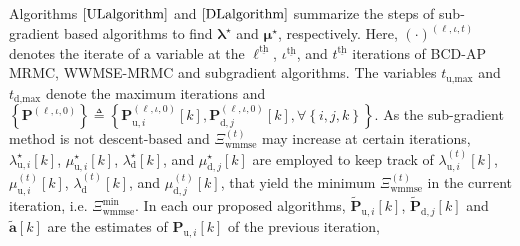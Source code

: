 \documentclass[10pt,journal]{IEEEtran}
\newcommand{\paren}[1]{\left({#1}\right)}
\newcommand{\bracket}[1]{{\left [{#1}\right ]}}
\newcommand{\braces}[1]{{\left\{ {#1}\right\}}}
\newcommand{\ith}[1]    {{#1}^{\underline{\text{th}}}}
\newcommand{\PiB}{\mathbf{P}_{\textrm{u},i}\bracket{k}}
\theoremstyle{definition}
\begin{document}
Algorithms $\ref{ULalgorithm}$ and $\ref{DLalgorithm}$ summarize the steps of sub-gradient based algorithms to find $\boldsymbol{\lambda}^\star$ and $\boldsymbol{\mu}^\star$, respectively. Here, $(\cdot)^{\paren{\ell,\iota,t}}$ denotes the iterate of a variable at the $\ith{\ell}$, $\ith{\iota}$, and $\ith{t}$  iterations of BCD-AP MRMC, WWMSE-MRMC and subgradient algorithms. The variables $t_{\textrm{u,max}}$ and $t_{\textrm{d,max}}$ denote the maximum iterations and $\braces{\mathbf{P}^{\paren{\ell,\iota,0}}}\triangleq\braces{\mathbf{P}^{\paren{\ell,\iota,0}}_{\textrm{u},i}\bracket{k},\mathbf{P}^{\paren{\ell,\iota,0}}_{\textrm{d},j}\bracket{k},\forall \braces{i,j,k}}$. As the sub-gradient method is not descent-based and $\Xi^{\paren{t}}_{\textrm{wmmse}}$ may increase at certain iterations\cite{Lui2006subg}, $\lambda^{\star}_{\textrm{u},i}\bracket{k}$, $\mu^\star_{\textrm{u},i}\bracket{k}$, $\lambda^{\star}_{\textrm{d}}\bracket{k}$, and $\mu^\star_{\textrm{d},j}\bracket{k}$ are employed to keep track of $\lambda^{\paren{t}}_{\textrm{u},i}\bracket{k}$, $\mu^{\paren{t}}_{\textrm{u},i}\bracket{k}$, $\lambda^{\paren{t}}_{\textrm{d}}\bracket{k}$, and $\mu^{\paren{t}}_{\textrm{d},j}\bracket{k}$,  that yield the minimum $\Xi^{\paren{t}}_{\textrm{wmmse}}$ in the current iteration, i.e.  $\Xi^{\textrm{min}}_{\textrm{wmmse}}$. In each our proposed algorithms, $\widetilde{\mathbf{P}}_{\textrm{u},i}\bracket{k}$, $\widetilde{\mathbf{P}}_{\textrm{d},j}\bracket{k}$ and $\widetilde{\mathbf{a}}\bracket{k}$ are the estimates of $\PiB$ of the previous iteration,
\end{document}
